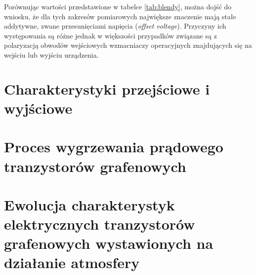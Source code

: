 	Porównując wartości przedstawione w tabelce \ref{tab:blendy}, można dojść do wniosku, że dla tych zakresów
	pomiarowych największe znaczenie mają stałe addytywne, zwane przesunięciami napięcia (\textit{offset voltage}).
	Przyczyny ich występowania są różne jednak w większości przypadków związane są z polaryzacją obwodów wejściowych
	wzmacniaczy operacyjnych znajdujących się na wejściu lub wyjściu urządzenia. 

	\section{Charakterystyki przejściowe i wyjściowe}
	\section{Proces wygrzewania prądowego tranzystorów grafenowych}
	\section{Ewolucja charakterystyk elektrycznych tranzystorów grafenowych wystawionych na działanie atmosfery}
